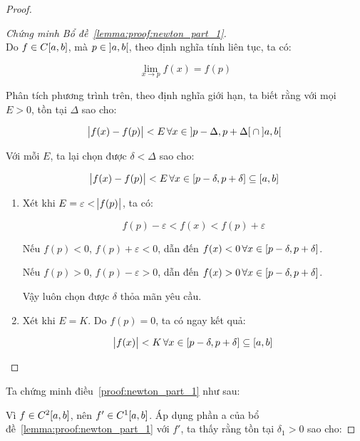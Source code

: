 \documentclass[../../Lectures]{subfiles}
\begin{document}
\begin{proof}
    \begin{proof}[Chứng minh Bổ đề~\ref{lemma:proof:newton_part_1}]
        $ $\\    %
        Do \(f \in C \interval{a}{b}\), mà \(p \in \interval[open]{a}{b}\), theo
        định nghĩa tính liên tục, ta có:

        \[\lim_{x \to p} f(x) = f(p)\]

        Phân tích phương trình trên, theo định nghĩa giới hạn, ta biết rằng với
        mọi \(E > 0\), tồn tại \(\Delta\) sao cho:

        \[\abs{f(x) - f(p)} < E \, \forall x \in \interval[open]{p - \Delta}{p + \Delta} \cap \interval[open]{a}{b}\]

        Với mỗi \(E\), ta lại chọn được \(\delta < \Delta\) sao cho:

        \[\abs{f(x) - f(p)} < E \, \forall x \in \interval{p - \delta}{p + \delta} \subseteq \interval{a}{b}\]

        \begin{enumerate}[label = (\alph*)]
            \item Xét khi \(E = \varepsilon < \abs{f(p)}\), ta có:

                \[f(p) - \varepsilon < f(x) < f(p) + \varepsilon\]

                Nếu \(f(p) < 0\), \(f(p) + \varepsilon < 0\), dẫn đến \(f(x) < 0
                \, \forall x \in \interval{p - \delta}{p + \delta}\).

                Nếu \(f(p) > 0\), \(f(p) - \varepsilon > 0\), dẫn đến \(f(x) > 0
                \, \forall x \in \interval{p - \delta}{p + \delta}\).

                Vậy luôn chọn được \(\delta\) thỏa mãn yêu cầu.

            \item Xét khi \(E = K\). Do \(f(p) = 0\), ta có ngay kết quả:

                \[\abs{f(x)} < K \, \forall x \in \interval{p - \delta}{p + \delta} \subseteq \interval{a}{b}\]
        \end{enumerate}
    \end{proof}

    Ta chứng minh điều~\ref{proof:newton_part_1} như sau:

    Vì \(f \in C^2 \interval{a}{b}\), nên \(f' \in C^1 \interval{a}{b}\). Áp
    dụng phần a của bổ đề~\ref{lemma:proof:newton_part_1} với \(f'\), ta thấy
    rằng tồn tại \(\delta_1 > 0\) sao cho:


\end{proof}
\end{document}
